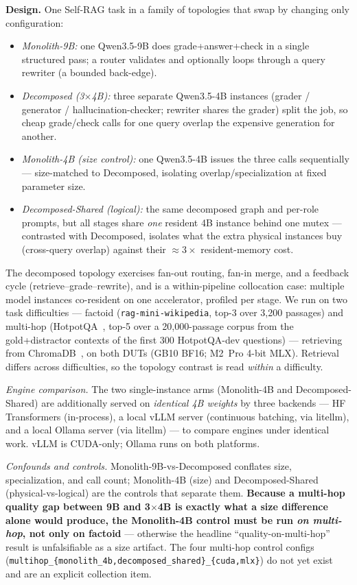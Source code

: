 \textbf{Design.} One Self-RAG task in a family of topologies that swap by
changing only configuration:
\begin{itemize}
  \item \emph{Monolith-9B:} one Qwen3.5-9B does grade+answer+check in a
    single structured pass; a router validates and optionally loops
    through a query rewriter (a bounded back-edge).
  \item \emph{Decomposed (3$\times$4B):} three separate Qwen3.5-4B
    instances (grader / generator / hallucination-checker; rewriter shares
    the grader) split the job, so cheap grade/check calls for one query
    overlap the expensive generation for another.
  \item \emph{Monolith-4B (size control):} one Qwen3.5-4B issues the three
    calls sequentially --- size-matched to Decomposed, isolating
    overlap/specialization at fixed parameter size.
  \item \emph{Decomposed-Shared (logical):} the same decomposed graph and
    per-role prompts, but all stages share \emph{one} resident 4B instance
    behind one mutex --- contrasted with Decomposed, isolates what the
    extra physical instances buy (cross-query overlap) against their
    ${\approx}3\times$ resident-memory cost.
\end{itemize}
The decomposed topology exercises fan-out routing, fan-in merge, and a
feedback cycle (retrieve--grade--rewrite), and is a within-pipeline
collocation case: multiple model instances co-resident on one accelerator,
profiled per stage. We run on two task difficulties --- factoid
(\texttt{rag-mini-wikipedia}, top-3 over 3{,}200 passages) and multi-hop
(HotpotQA~\cite{yang2018hotpotqa}, top-5 over a 20{,}000-passage corpus
from the gold+distractor contexts of the first 300 HotpotQA-dev
questions) --- retrieving from ChromaDB~\cite{chroma}, on both DUTs (GB10
BF16; M2~Pro 4-bit MLX). Retrieval differs across difficulties, so the
topology contrast is read \emph{within} a difficulty.

\emph{Engine comparison.} The two single-instance arms (Monolith-4B and
Decomposed-Shared) are additionally served on \emph{identical 4B weights}
by three backends --- HF Transformers (in-process), a local vLLM server
(continuous batching, via litellm), and a local Ollama server (via
litellm) --- to compare engines under identical work. vLLM is CUDA-only;
Ollama runs on both platforms.

\emph{Confounds and controls.} Monolith-9B-vs-Decomposed conflates size,
specialization, and call count; Monolith-4B (size) and Decomposed-Shared
(physical-vs-logical) are the controls that separate them.
\textbf{Because a multi-hop quality gap between 9B and 3$\times$4B is
exactly what a size difference alone would produce, the Monolith-4B
control must be run \emph{on multi-hop}, not only on factoid} --- otherwise
the headline ``quality-on-multi-hop'' result is unfalsifiable as a size
artifact. The four multi-hop control configs
(\texttt{multihop\_\{monolith\_4b,decomposed\_shared\}\_\{cuda,mlx\}}) do
not yet exist and are an explicit collection item.

